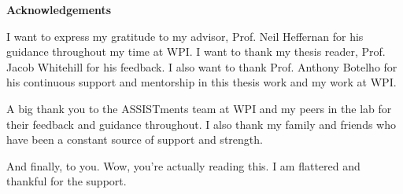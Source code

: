 \documentclass[12pt]{report}
\begin{document}


\begin{center}
	\textbf{Acknowledgements}
\end{center}

I want to express my gratitude to my advisor, Prof. Neil Heffernan for his guidance throughout my time at WPI. I want to thank my thesis reader, Prof. Jacob Whitehill for his feedback. I also want to thank Prof. Anthony Botelho for his continuous support and mentorship in this thesis work and my work at WPI. 

A big thank you to the ASSISTments team at WPI and my peers in the lab for their feedback and guidance throughout. I also thank my family and friends who have been a constant source of support and strength. 

And finally, to you. Wow, you're actually reading this. I am flattered and thankful for the support.





\clearpage



\tableofcontents
\clearpage


\end{document}
